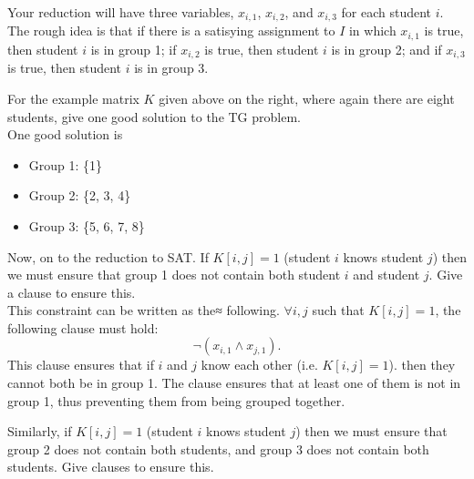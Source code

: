 \documentclass[11pt,fleqn]{exam}
\newif\ifsolutions\solutionsfalse
\newenvironment{soln}{\color{solnblue}}{}
\begin{document}
Your reduction will have three variables, $x_{i,1}$, $x_{i,2}$, and $x_{i,3}$ for each student $i$. The rough idea is that if there is a satisying assignment to $I$ in which $x_{i,1}$ is true, then student $i$ is in group 1; if $x_{i,2}$ is true, then student $i$ is in group 2; and if $x_{i,3}$ is true, then student $i$ is in group 3.


\begin{questions}
  \question[2]
  For the example matrix $K$ given above on the right, where again there are eight students, give one good solution to the TG problem. \\
  \begin{soln}
    One good solution is
    \begin{itemize}
      \item Group 1: \{1\}
      \item Group 2: \{2, 3, 4\}
      \item Group 3: \{5, 6, 7, 8\}
    \end{itemize}
  \end{soln}


  \question[2]
  Now, on to the reduction to SAT. If $K[i,j] = 1$ (student $i$ knows student $j$) then we must ensure that
  group 1 does not contain both student $i$ and student $j$.
  Give a clause to ensure this. \\
  \begin{soln}
  This constraint can be written as the≈ following. $\forall i, j$ such that $K[i,j]=1$, the following clause must hold: 
    \[
         \neg (x_{i,1}\wedge x_{j,1}).
    \]
    This clause ensures that if $i$ and $j$ know each other (i.e. $K[i,j]=1$). then they cannot both be in group 1. The clause ensures that at least one of them is not in group 1, thus preventing them from being grouped together.
  \end{soln}

  \ifsolutions
    
  \fi

  \question[2]
  Similarly, if $K[i,j] = 1$ (student $i$ knows student $j$) then we must ensure
  that group 2 does not contain both students, and group 3 does not contain both students.
  Give clauses to ensure this. \\
  \begin{soln}
  

\end{soln}
\end{questions}
\end{document}
